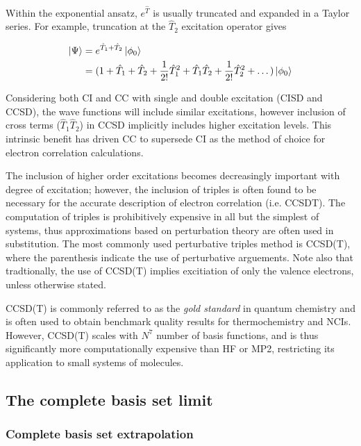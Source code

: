 Within the exponential ansatz, $e^{\hat{T}}$ is usually truncated and expanded
in a Taylor series. For example, truncation at the $\hat{T}_2$ excitation
operator gives

\begin{equation}
\begin{split}
  \ket{\Psi} &= e^{\hat{T}_1+\hat{T}_2}\ket{\phi_0} \\
  &= (1 + \hat{T}_1 + \hat{T}_2 +  \frac{1}{2!}\hat{T}_1^2 + \hat{T}_1\hat{T}_2 + \frac{1}{2!}\hat{T}_2^2 + \dots)
  \ket{\phi_0}
\end{split}
\end{equation}

\noindent Considering both CI and CC with single and double excitation (CISD and
CCSD), the wave functions will include similar excitations, however inclusion of
cross terms ($\hat{T}_1\hat{T}_2$) in CCSD implicitly includes higher excitation
levels. This intrinsic benefit has driven CC to supersede CI as the method of
choice for electron correlation calculations.

The inclusion of higher order excitations becomes decreasingly important with
degree of excitation; however, the inclusion of triples is often found to be
necessary for the accurate description of electron correlation (i.e. CCSDT). The
computation of triples is prohibitively expensive in all but the simplest of
systems, thus approximations based on perturbation theory are often used in
substitution. The most commonly used perturbative triples method is CCSD(T),
where the parenthesis indicate the use of perturbative arguements. Note also
that tradtionally, the use of CCSD(T) implies excitiation of only the valence
electrons, unless otherwise stated.

CCSD(T) is commonly referred to as the \emph{gold standard} in quantum chemistry
and is often used to obtain benchmark quality results for thermochemistry and
NCIs.\cite{Levine2013} However, CCSD(T) scales with $N^7$ number of basis
functions, and is thus significantly more computationally expensive than HF or
MP2, restricting its application to small systems of molecules.

\subsection{The complete basis set limit}

\subsubsection{Complete basis set extrapolation}

